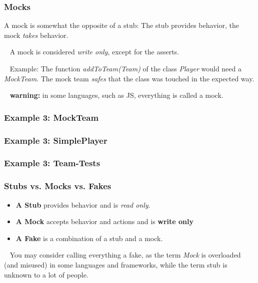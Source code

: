 \documentclass[12pt]{beamer}
\begin{document}
	\begin{frame}
		\frametitle{Mocks}
		A mock is somewhat the opposite of a stub: 
		The stub provides behavior, the mock \textit{takes} behavior.
		
		~\newline
		A mock is considered \textit{write only}, except for the asserts. 
		
		~\newline
		Example: The function \textit{addToTeam(Team)} of the class \textit{Player} would need a \textit{MockTeam}. 
		The mock team \textit{safes} that the class was touched in the expected way.
		
		~\newline
		\textbf{warning:} in some languages, such as JS, everything is called a mock. 
	\end{frame}

	\begin{frame}
		\frametitle{Example 3: MockTeam}
		\begin{small}
			
				
		\end{small}
	\end{frame}
	
	\begin{frame}
		\frametitle{Example 3: SimplePlayer}
		\begin{small}
				
		\end{small}
	\end{frame}
	
	\begin{frame}
		\frametitle{Example 3: Team-Tests}
		\begin{scriptsize}
			
		\end{scriptsize}
	\end{frame}

	\begin{frame}
		\frametitle{Stubs vs. Mocks vs. Fakes}
		
		\begin{itemize}
			\item \textbf{A Stub} provides behavior and is \textit{read only}. 
			\item \textbf{A Mock} accepts behavior and actions and is \textbf{write only}
			\item \textbf{A Fake} is a combination of a stub and a mock. 
		\end{itemize}
	
		~\newline
		You may consider calling everything a fake, as the term \textit{Mock} is overloaded (and misused) in some languages and frameworks, while the term stub is unknown to a lot of people.  
	\end{frame}
	
\end{document}
